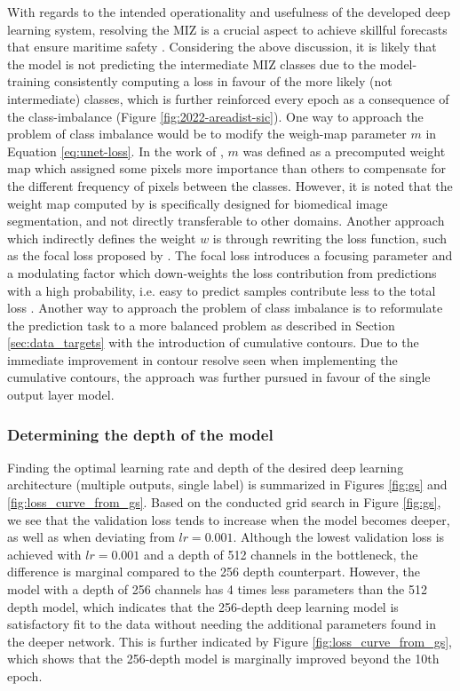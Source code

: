 \documentclass[../main/thesis]{subfiles}
\begin{document}
With regards to the intended operationality and usefulness of the developed deep learning system, resolving the MIZ is a crucial aspect to achieve skillful forecasts that ensure maritime safety \citep{Wagner2020}. Considering the above discussion, it is likely that the model is not predicting the intermediate MIZ classes due to the model-training consistently computing a loss in favour of the more likely (not intermediate) classes, which is further reinforced every epoch as a consequence of the class-imbalance (Figure \ref{fig:2022-areadist-sic}). One way to approach the problem of class imbalance would be to modify the weigh-map parameter $m$ in Equation \ref{eq:unet-loss}. In the work of \citet{Ronneberger2015}, $m$ was defined as a precomputed weight map which assigned some pixels more importance than others to compensate for the different frequency of pixels between the classes. However, it is noted that the weight map computed by \citet{Ronneberger2015} is specifically designed for biomedical image segmentation, and not directly transferable to other domains. Another approach which indirectly defines the weight $w$ is through rewriting the loss function, such as the focal loss proposed by \citet{Lin2017}. The focal loss introduces a focusing parameter and a modulating factor which down-weights the loss contribution from predictions with a high probability, i.e. easy to predict samples contribute less to the total loss \citep{Lin2017}. Another way to approach the problem of class imbalance is to reformulate the prediction task to a more balanced problem as described in Section \ref{sec:data_targets} with the introduction of cumulative contours. Due to the immediate improvement in contour resolve seen when implementing the cumulative contours, the approach was further pursued in favour of the single output layer model.

\subsubsection{Determining the depth of the model}
\label{sec:discuss_depth}
Finding the optimal learning rate and depth of the desired deep learning architecture (multiple outputs, single label) is summarized in Figures \ref{fig:gs} and \ref{fig:loss_curve_from_gs}. Based on the conducted grid search in Figure \ref{fig:gs}, we see that the validation loss tends to increase when the model becomes deeper, as well as when deviating from $lr = 0.001$. Although the lowest validation loss is achieved with $lr = 0.001$ and a depth of 512 channels in the bottleneck, the difference is marginal compared to the 256 depth counterpart. However, the model with a depth of 256 channels has 4 times less parameters than the 512 depth model, which indicates that the 256-depth deep learning model is satisfactory fit to the data without needing the additional parameters found in the deeper network. This is further indicated by Figure \ref{fig:loss_curve_from_gs}, which shows that the 256-depth model is marginally improved beyond the 10th epoch. 
\end{document}
